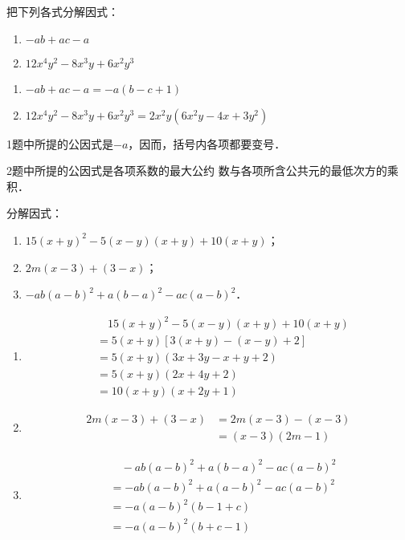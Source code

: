 \begin{example}
    把下列各式分解因式：
\begin{enumerate}
    \item $-ab+ac-a$
    \item $12x^4y^2-8x^3y+6x^2y^3$
\end{enumerate}
\end{example}

\begin{solution}
\begin{enumerate}
    \item $-ab+ac-a=-a(b-c+1)$
    \item $12x^4y^2-8x^3y+6x^2y^3=2x^2y(6x^2y-4x+3y^2)$
\end{enumerate}
\end{solution}

\begin{note}
1题中所提的公因式是$-a$，因而，括号内各项都要变号．

2题中所提的公因式是各项系数的最大公约
    数与各项所含公共元的最低次方的乘积．
\end{note}

\begin{example}
分解因式：
\begin{enumerate}
    \item $15(x+y)^2-5(x-y)(x+y)+10(x+y)$；
    \item $2m(x-3)+(3-x)$；
    \item $-ab(a-b)^2+a(b-a)^2-ac(a-b)^2$．
\end{enumerate} 
\end{example}

\begin{solution}
\begin{enumerate}
    \item \[\begin{split}
     &\quad   15 (x+y)^2-5 (x-y) (x+y)+10 (x+y)\\
    &=5 (x+y) [3(x+y)-(x-y)+2]\\
    &=5 (x+y) (3x+3y-x+y+2)\\
    &=5 (x+y) (2x+4y+2)\\
    &=10 (x+y) (x+2y+1)
    \end{split}\]
    \item \[\begin{split}
        2m (x-3) + (3-x)&= 2m (x-3) - (x-3)\\
        &= (x-3) (2m-1)
    \end{split}\]
        \item \[\begin{split}
       &\quad      -ab(a-b)^2 +a(b-a)^2 - ac(a-b)^2\\
            &= -ab (a-b)^2 +a (a-b)^2-ac (a-b)^2\\
            &=  -a (a-b)^2 (b-1+c)\\
            &=-a(a-b)^2 (b+c-1)
        \end{split}\]
\end{enumerate}
\end{solution}

